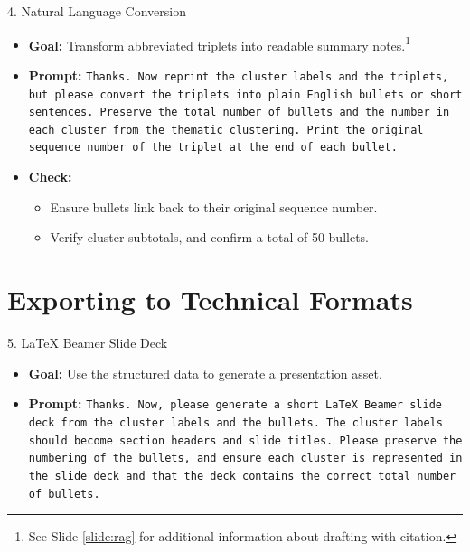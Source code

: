 \documentclass[aspectratio=169]{beamer}
\begin{document}
\begin{frame}{4. Natural Language Conversion}\label{slide:summary}
\begin{itemize}
  \item \textbf{Goal:} Transform abbreviated triplets into readable summary notes.\footnote{See Slide \ref{slide:rag} for additional information about drafting with citation.}
  \item \textbf{Prompt:} \texttt{Thanks. Now reprint the cluster labels and the triplets, but please convert the triplets into plain English bullets or short sentences. Preserve the total number of bullets and the number in each cluster from the thematic clustering. Print the original sequence number of the triplet at the end of each bullet.}
  \item \textbf{Check:}
    \begin{itemize}
      \item Ensure bullets link back to their original sequence number.
      \item Verify cluster subtotals, and confirm a total of 50 bullets.
    \end{itemize}
\end{itemize}
\end{frame}

\section{Exporting to Technical Formats}

\begin{frame}{5. LaTeX Beamer Slide Deck}
\begin{itemize}
  \item \textbf{Goal:} Use the structured data to generate a presentation asset.
  \item \textbf{Prompt:} \texttt{Thanks. Now, please generate a short LaTeX Beamer slide deck from the cluster labels and the bullets. The cluster labels should become section headers and slide titles. Please preserve the numbering of the bullets, and ensure each cluster is represented in the slide deck and that the deck contains the correct total number of bullets.}
\end{itemize}
\end{frame}
\end{document}
